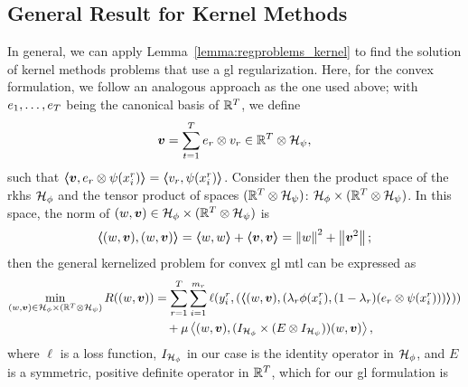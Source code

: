 \subsection{General Result for Kernel Methods}
In general, we can apply Lemma~\ref{lemma:regproblems_kernel} to find the solution of kernel methods problems that use a \acrshort{gl} regularization.
Here, for the convex formulation, we follow an analogous approach as the one used above; with ${e_1, \ldots, e_T}$ being the canonical basis of $\mathbb{R}^T$, we define
\begin{equation}
    \label{eq:vtensor_def}
    \fv{v} = \sum_{t=1}^T e_r \otimes v_r \in \reals^\ntasks \otimes \hilbertspace_\psi,
\end{equation}
such that
$\bm{\left\langle} \bm{v}, e_r \otimes \psi(x_i^r) \bm{\right\rangle} = \bm{\left\langle} v_r, \psi(x_i^r) \bm{\right\rangle}$.
Consider then the product space of the \acrshort{rkhs} $\mathcal{H}_\phi$ and the tensor product of spaces $(\mathbb{R}^T \otimes \mathcal{H}_\psi)$: $\mathcal{H}_\phi \times (\mathbb{R}^T \otimes \mathcal{H}_\psi)$. In this space, the norm of $(w, \bm{v}) \in \mathcal{H}_\phi \times (\mathbb{R}^T \otimes \mathcal{H}_\psi)$ is
$$\bm{\left\langle} (w, \bm{v}), (w, \bm{v}) \bm{\right\rangle} =  \bm{\left\langle} w, w \bm{\right\rangle} + \bm{\left\langle} \bm{v}, \bm{v} \bm{\right\rangle} = \left\lVert w\right\rVert^2 + \left\lVert\bm{v}^2\right\rVert; $$
then the general kernelized problem for convex \acrshort{gl} \acrshort{mtl} can be expressed as
\begin{equation}\label{eq:cvxgl_general_problem_tensor}
    \begin{aligned}
        \min_{(w, \fv{v}) \in \hilbertspace_\phi \times (\reals^\ntasks \otimes \hilbertspace_\psi)} R((w, \fv{v})) & = \sum_{r=1}^\ntasks \sum_{i=1}^{\npertask_r} \ell(y_i^r, (\dotp{(w, \fv{v})}{(\lambda_r \phi(x_i^r), (1 - \lambda_r) (e_r \otimes \psi({x}_i^r)))})) \\
                                                                                                                       & \quad + \mu \dotp{(w, \fv{v})}{(I_{\rkhs_\phi} \times (E \otimes I_{\rkhs_\psi})) (w, \fv{v})}  ,
    \end{aligned}
\end{equation}
where $\ell$ is a loss function, $I_{\mathcal{H}_\phi}$ in our case is the identity operator in $\mathcal{H}_\phi$, and $E$ is a symmetric, positive definite operator in $\mathbb{R}^T$, which for our \acrshort{gl} formulation is
